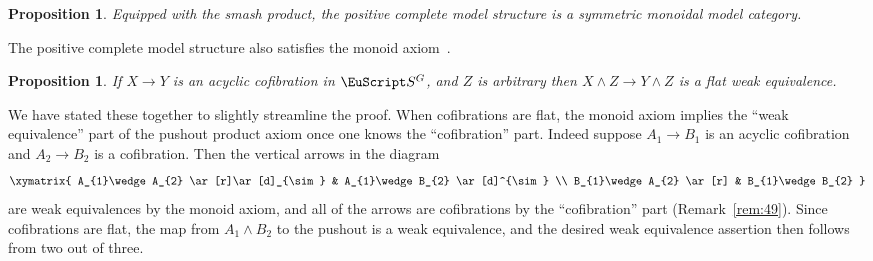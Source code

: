 \documentclass{amsart}
\newtheorem{prop}[equation]{Proposition}
\theoremstyle{definition}
\theoremstyle{remark}
\newcommand{\spectra}{\EuScript S}
\newcommand{\ugspectra}[1]{\spectra^{#1}}
\begin{document}
\begin{prop}
\label{thm:95} Equipped with the smash product, the positive complete
model structure is a symmetric monoidal model category.
\end{prop}

The positive complete model structure also satisfies the
monoid axiom~\cite[Definition~3.3]{MR1734325}.

\begin{prop}
\label{thm:259}
If $X\to Y$ is an acyclic cofibration in $\ugspectra{G}$, and $Z$ is
arbitrary then $X\wedge Z\to Y\wedge Z$ is a flat weak equivalence.
\end{prop}

We have stated these together to slightly streamline the proof.  When
cofibrations are flat, the monoid axiom implies the ``weak
equivalence'' part of the pushout product axiom once one knows the
``cofibration'' part.  Indeed suppose $A_{1}\to B_{1}$ is an acyclic
cofibration and $A_{2}\to B_{2}$ is a cofibration.  Then the vertical
arrows in the diagram
\[
\xymatrix{
A_{1}\wedge A_{2}  \ar[r]\ar[d]_{\sim}  & A_{1}\wedge B_{2}
\ar[d]^{\sim} \\
B_{1}\wedge A_{2}  \ar[r]        & B_{1}\wedge B_{2}
}
\]
are weak equivalences by the monoid axiom, and all of the arrows are
cofibrations by the ``cofibration'' part (Remark~\ref{rem:49}).  Since
cofibrations are flat, the map from $A_{1}\wedge B_{2}$ to the pushout
is a weak equivalence, and the desired weak equivalence assertion then
follows from two out of three.
\end{document}
